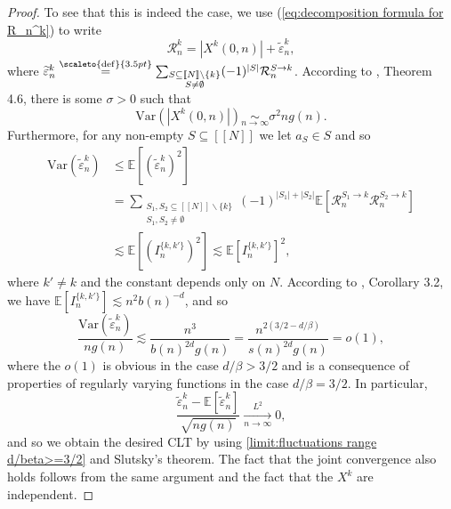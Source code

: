 \documentclass[12pt]{article}
\newcommand{\R}{\mathcal R}
\newcommand{\EE}{\mathbb E}
\newcommand{\1}{\mathds{1}}
\newcommand{\Var}{\mathrm{Var}}
\newcommand{\eqdef}{\stackrel{\scaleto{\mathrm{def}}{3.5pt}}{=}}
\numberwithin{equation}{section}
\begin{document}
\begin{proof}
    To see that this is indeed the case, we use (\ref{eq:decomposition formula for R_n^k}) to write
    \begin{equation*}
        \R_n^k=\left|X^k(0,n)\right|+\widetilde\varepsilon_n^k,
    \end{equation*}
    where $\widetilde\varepsilon_n^k\eqdef\sum_{\substack{S\subseteq[\![N]\!]\backslash\{k\}\\ S\ne\emptyset}}(-1)^{|S|}\R_n^{S\rightarrow k}$. According to \cite{LeGallRosenRangeOfStableRandomWalks1991}, Theorem 4.6, there is some $\sigma>0$ such that 
    \begin{equation*}
        \Var\left(\left|X^k(0,n)\right|\right)\underset{n\rightarrow\infty}\sim \sigma^2ng(n).
    \end{equation*}
    Furthermore, for any non-empty $S\subseteq[\![N]\!]$ we let $a_S\in S$ and so
    \begin{align*}
        \Var\left(\widetilde\varepsilon_n^k\right)&\le\EE\left[(\widetilde\varepsilon_n^k)^2\right]\\
        &=\sum_{\substack{S_1,S_2\subseteq[\![N]\!]\backslash\{k\}\\ S_1,S_2\ne\emptyset}}(-1)^{|S_1|+|S_2|}\EE\left[\R_n^{S_1\rightarrow k}\R_n^{S_2\rightarrow k}\right]\\
        &\lesssim\EE\left[\left(I_n^{\{k,k'\}}\right)^2\right]\lesssim\EE\left[I_n^{\{k,k'\}}\right]^2,
    \end{align*}    
    where $k'\ne k$ and the constant depends only on $N$. According to \cite{LeGallRosenRangeOfStableRandomWalks1991}, Corollary 3.2, we have $\EE\left[I_n^{\{k,k'\}}\right]\lesssim n^2b(n)^{-d}$, and so
    \begin{equation*}
        \frac{\Var\left(\widetilde\varepsilon_n^k\right)}{ng(n)}\lesssim \frac{n^3}{b(n)^{2d}g(n)}=\frac{n^{2(3/2-d/\beta)}}{s(n)^{2d}g(n)}=o(1),
    \end{equation*}
    where the $o(1)$ is obvious in the case $d/\beta>3/2$ and is a consequence of properties of regularly varying functions in the case $d/\beta=3/2$. In particular, 
    \begin{equation*}
        \frac{\widetilde\varepsilon_n^k-\EE\left[\widetilde\varepsilon_n^k\right]}{\sqrt{ng(n)}}\underset{n\rightarrow\infty}{\overset{L^2}\longrightarrow}0,
    \end{equation*}
    and so we obtain the desired CLT by using \eqref{limit:fluctuations range d/beta>=3/2} and Slutsky's theorem. The fact that the joint convergence also holds follows from the same argument and the fact that the $X^k$ are independent.
\end{proof}
\end{document}
